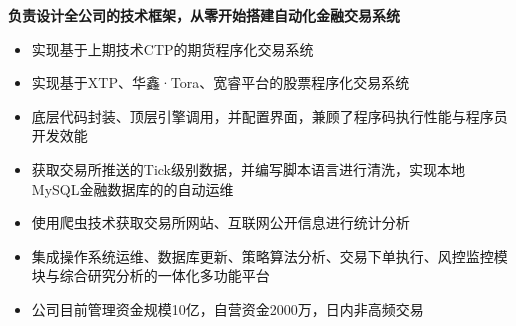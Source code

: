 \documentclass[10pt,a4paper]{altacv}
\begin{document}

\begin{fullwidth}
\makecvheader
\end{fullwidth}



\textbf{负责设计全公司的技术框架，从零开始搭建自动化金融交易系统}
\vspace{0.15cm}

\begin{itemize}
    \item 实现基于上期技术CTP的期货程序化交易系统
    \item 实现基于XTP、华鑫·Tora、宽睿平台的股票程序化交易系统
    \item 底层代码封装、顶层引擎调用，并配置界面，兼顾了程序码执行性能与程序员开发效能
    \item 获取交易所推送的Tick级别数据，并编写脚本语言进行清洗，实现本地MySQL金融数据库的的自动运维
    \item 使用爬虫技术获取交易所网站、互联网公开信息进行统计分析
    \item 集成操作系统运维、数据库更新、策略算法分析、交易下单执行、风控监控模块与综合研究分析的一体化多功能平台
    \item 公司目前管理资金规模10亿，自营资金2000万，日内非高频交易
\end{itemize}
\end{document}
